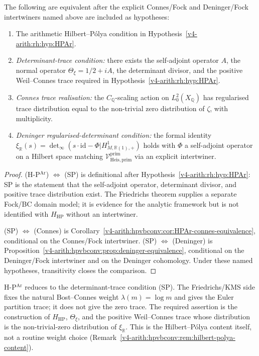 \begin{theorem}
\label{v4-arith:hpvbconv:thm:HPAr-equivalence}
The following are equivalent after the
explicit Connes/Fock and Deninger/Fock intertwiners named above are
included as hypotheses:
\begin{enumerate}
\item[(H-P\(^{\mathrm{Ar}}\))] The arithmetic Hilbert--P\'olya
condition in Hypothesis~\ref{v4-arith:rh:hyp:HPAr}.
\item[(SP)] \emph{Determinant-trace condition:} there exists the
self-adjoint operator \(A\), the normal operator
\(\Theta_{\xi}=1/2+iA\), the determinant divisor, and the positive
Weil--Connes trace required in Hypothesis~\ref{v4-arith:rh:hyp:HPAr}.
\item[(Connes)] \emph{Connes trace realisation:} the
\(C_{\mathbb{Q}}\)-scaling action on \(L^{2}_{0}(X_{\mathbb{Q}})\) has
regularised trace distribution equal to the non-trivial zero
distribution of \(\zeta\), with multiplicity.
\item[(Deninger)] \emph{Deninger regularised-determinant condition:}
the formal identity
\(\xi_{\mathbb R}(s)=
\det_{\infty}(s\cdot\mathrm{id}-\Phi|H^{1}_{M,\mathbb{R}(1),+})\)
holds with \(\Phi\) a self-adjoint operator on a Hilbert space matching
\(\mathcal{V}^{\mathrm{prim}}_{\mathrm{Heis},\mathrm{prim}}\) via an
explicit intertwiner.
\end{enumerate}
\end{theorem}

\begin{proof}
(H-P\(^{\mathrm{Ar}}\)) \(\Leftrightarrow\) (SP) is definitional after
Hypothesis~\ref{v4-arith:rh:hyp:HPAr}: SP is the statement that the
self-adjoint operator, determinant divisor, and positive trace
distribution exist. The Friedrichs theorem supplies a
separate Fock/BC domain model; it is evidence for the analytic
framework but is not identified with \(H_{\mathrm{HP}}\) without an
intertwiner.

(SP) \(\Leftrightarrow\) (Connes) is
Corollary~\ref{v4-arith:hpvbconv:cor:HPAr-connes-equivalence}, conditional on
the Connes/Fock intertwiner. (SP) \(\Leftrightarrow\) (Deninger) is
Proposition~\ref{v4-arith:hpvbconv:prop:deninger-equivalence}, conditional on
the Deninger/Fock intertwiner and on the Deninger cohomology. Under
these named hypotheses, transitivity closes the comparison.
\end{proof}

\begin{corollary}
\label{v4-arith:hpvbconv:cor:HPAr-single-residual}
H-P\(^{\mathrm{Ar}}\) reduces to the
determinant-trace condition (SP). The Friedrichs/KMS side fixes the
natural Bost--Connes weight \(\lambda(m)=\log m\) and gives the Euler
partition trace; it does not give the zero trace. The required
assertion is the construction of \(H_{\mathrm{HP}}\),
\(\Theta_{\xi}\), and the positive Weil--Connes trace whose
distribution is the non-trivial-zero distribution of
\(\xi_{\mathbb R}\). This is the Hilbert--P\'olya content itself, not
a routine weight choice
(Remark~\ref{v4-arith:hpvbconv:rem:hilbert-polya-content}).
\end{corollary}

